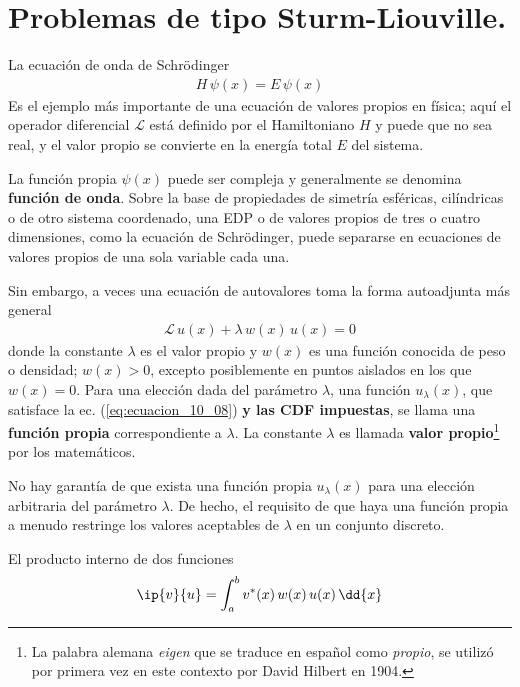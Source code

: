 \section{Problemas de tipo Sturm-Liouville.}
La ecuación de onda de Schrödinger
\begin{align*}
H \, \psi (x) = E \, \psi (x)
\end{align*}
Es el ejemplo más importante de una ecuación de valores propios en física; aquí el operador diferencial $\mathcal{L}$ está definido por el Hamiltoniano $H$ y puede que no sea real, y el valor propio se convierte en la energía total $E$ del sistema. 
\par
La función propia $\psi (x)$ puede ser compleja y generalmente se denomina \textbf{función de onda}. Sobre la base de propiedades de simetría esféricas, cilíndricas o de otro sistema coordenado, una EDP o de valores propios de tres o cuatro dimensiones, como la ecuación de Schrödinger, puede separarse en ecuaciones de valores propios de una sola variable cada una.
\par
Sin embargo, a veces una ecuación de autovalores toma la forma autoadjunta más general
\begin{align}
\mathcal{L} \, u(x) + \lambda \, w(x) \, u(x) = 0
\label{eq:ecuacion_10_08}
\end{align}
donde la constante $\lambda$ es el valor propio y $w(x)$ es una función conocida de peso o densidad; $w(x) > 0$, excepto posiblemente en puntos aislados en los que $w(x) = 0$. Para una elección dada del parámetro $\lambda$, una función $u_{\lambda}(x)$, que satisface la ec. (\ref{eq:ecuacion_10_08}) \textbf{y las CDF impuestas}, se llama una \textbf{función propia} correspondiente a $\lambda$. La constante $\lambda$ es llamada \textbf{valor propio}\footnote{La palabra alemana \emph{eigen} que se traduce en español como \emph{propio}, se utilizó por primera vez en este contexto por David Hilbert en 1904.} por los matemáticos.
\par
No hay garantía de que exista una función propia $u_{\lambda} (x)$ para una elección arbitraria del parámetro $\lambda$. De hecho, el requisito de que haya una función propia a menudo restringe los valores aceptables de $\lambda$ en un conjunto discreto. 
\par
El producto interno de dos funciones
\begin{align*}
\ip{v}{u} = \int_{a}^{b} v^{*}(x) \, w(x) \, u(x) \, \dd{x}
\end{align*}
